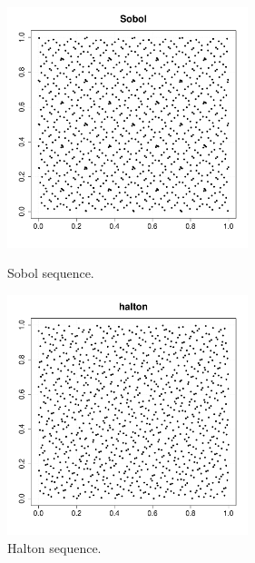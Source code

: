              \begin{figure}[H]
               \begin{minipage}{10cm}
                 \begin{center}
                   \includegraphics[width=7cm]{Figures/sobol_cloud.pdf}
                   \caption{Sobol sequence.}
                   \label{Sobol}
                 \end{center}
               \end{minipage}
               \hfill
               \begin{minipage}{10cm}
                 \begin{center}
                   \includegraphics[width=7cm]{Figures/halton_cloud.pdf}
                   \caption{Halton sequence.}
                   \label{Halton}
                 \end{center}
               \end{minipage}
             \end{figure}



